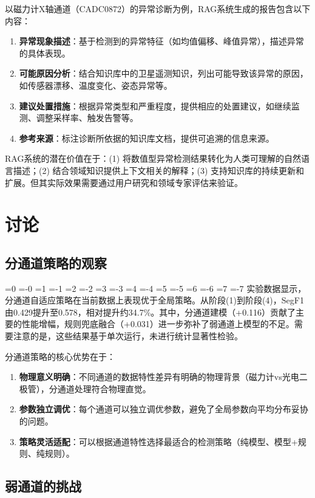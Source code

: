 \documentclass[12pt, a4paper]{article}
\newcommand{\zihao}[1]{%
    \ifnum#1=0 {\fontsize{42pt}{50pt}\selectfont}%
    \else\ifnum#1=-0 {\fontsize{36pt}{44pt}\selectfont}%
    \else\ifnum#1=1 {\fontsize{26pt}{32pt}\selectfont}%
    \else\ifnum#1=-1 {\fontsize{24pt}{28pt}\selectfont}%
    \else\ifnum#1=2 {\fontsize{22pt}{26pt}\selectfont}%
    \else\ifnum#1=-2 {\fontsize{18pt}{22pt}\selectfont}%
    \else\ifnum#1=3 {\fontsize{16pt}{20pt}\selectfont}%
    \else\ifnum#1=-3 {\fontsize{15pt}{18pt}\selectfont}%
    \else\ifnum#1=4 {\fontsize{14pt}{17pt}\selectfont}%
    \else\ifnum#1=-4 {\fontsize{12pt}{15pt}\selectfont}%
    \else\ifnum#1=5 {\fontsize{10.5pt}{13pt}\selectfont}%
    \else\ifnum#1=-5 {\fontsize{9pt}{11pt}\selectfont}%
    \else\ifnum#1=6 {\fontsize{7.5pt}{9pt}\selectfont}%
    \else\ifnum#1=-6 {\fontsize{6.5pt}{8pt}\selectfont}%
    \else\ifnum#1=7 {\fontsize{5.5pt}{7pt}\selectfont}%
    \else\ifnum#1=-7 {\fontsize{5pt}{6pt}\selectfont}%
    \fi\fi\fi\fi\fi\fi\fi\fi\fi\fi\fi\fi\fi\fi\fi\fi
}
\newcommand{\songti}{\CJKfontspec{SimSun}}
\begin{document}
以磁力计X轴通道（CADC0872）的异常诊断为例，RAG系统生成的报告包含以下内容：

\begin{enumerate}[label=(\arabic*)]
    \item \textbf{异常现象描述}：基于检测到的异常特征（如均值偏移、峰值异常），描述异常的具体表现。
    \item \textbf{可能原因分析}：结合知识库中的卫星遥测知识，列出可能导致该异常的原因，如传感器漂移、温度变化、姿态异常等。
    \item \textbf{建议处置措施}：根据异常类型和严重程度，提供相应的处置建议，如继续监测、调整采样率、触发告警等。
    \item \textbf{参考来源}：标注诊断所依据的知识库文档，提供可追溯的信息来源。
\end{enumerate}

RAG系统的潜在价值在于：(1) 将数值型异常检测结果转化为人类可理解的自然语言描述；(2) 结合领域知识提供上下文相关的解释；(3) 支持知识库的持续更新和扩展。但其实际效果需要通过用户研究和领域专家评估来验证。

\section{讨论}

\subsection{分通道策略的观察}

\zihao{5}\songti
实验数据显示，分通道自适应策略在当前数据上表现优于全局策略。从阶段(1)到阶段(4)，SegF1由0.429提升至0.578，相对提升约34.7\%。其中，分通道建模（+0.116）贡献了主要的性能增幅，规则兜底融合（+0.031）进一步弥补了弱通道上模型的不足。需要注意的是，这些结果基于单次运行，未进行统计显著性检验。

分通道策略的核心优势在于：
\begin{enumerate}[label=(\arabic*)]
    \item \textbf{物理意义明确}：不同通道的数据特性差异有明确的物理背景（磁力计vs光电二极管），分通道处理符合物理直觉。
    \item \textbf{参数独立调优}：每个通道可以独立调优参数，避免了全局参数向平均分布妥协的问题。
    \item \textbf{策略灵活适配}：可以根据通道特性选择最适合的检测策略（纯模型、模型+规则、纯规则）。
\end{enumerate}

\subsection{弱通道的挑战}
\end{document}
